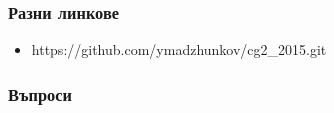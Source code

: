 \documentclass[serif,mathserif,14pt]{beamer}
\begin{document}
\begin{frame}
  \frametitle{Разни линкове}
  \begin{itemize}
  \item https://github.com/ymadzhunkov/cg2\_2015.git
  \end{itemize}
\end{frame}

\begin{frame}
  \frametitle{Въпроси}
\end{frame}
\end{document}
